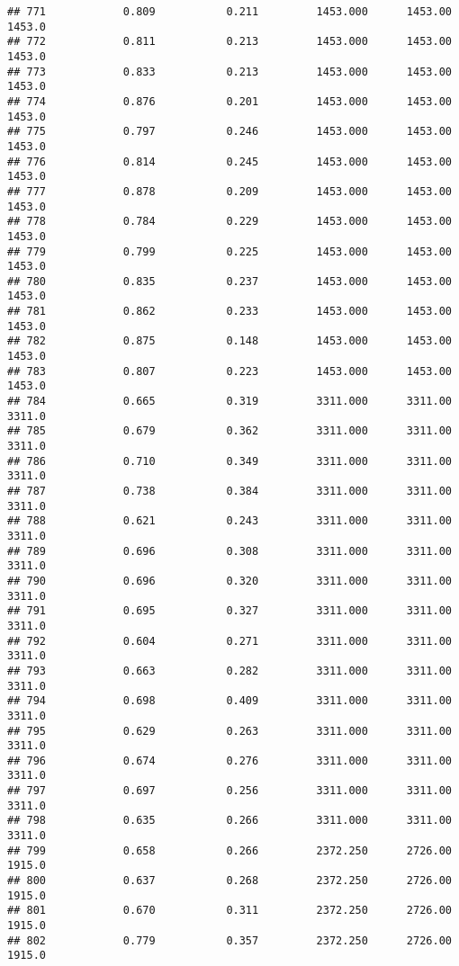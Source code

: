 \documentclass[
]{article}
\begin{document}
\begin{verbatim}
## 771            0.809           0.211         1453.000      1453.00       1453.0
## 772            0.811           0.213         1453.000      1453.00       1453.0
## 773            0.833           0.213         1453.000      1453.00       1453.0
## 774            0.876           0.201         1453.000      1453.00       1453.0
## 775            0.797           0.246         1453.000      1453.00       1453.0
## 776            0.814           0.245         1453.000      1453.00       1453.0
## 777            0.878           0.209         1453.000      1453.00       1453.0
## 778            0.784           0.229         1453.000      1453.00       1453.0
## 779            0.799           0.225         1453.000      1453.00       1453.0
## 780            0.835           0.237         1453.000      1453.00       1453.0
## 781            0.862           0.233         1453.000      1453.00       1453.0
## 782            0.875           0.148         1453.000      1453.00       1453.0
## 783            0.807           0.223         1453.000      1453.00       1453.0
## 784            0.665           0.319         3311.000      3311.00       3311.0
## 785            0.679           0.362         3311.000      3311.00       3311.0
## 786            0.710           0.349         3311.000      3311.00       3311.0
## 787            0.738           0.384         3311.000      3311.00       3311.0
## 788            0.621           0.243         3311.000      3311.00       3311.0
## 789            0.696           0.308         3311.000      3311.00       3311.0
## 790            0.696           0.320         3311.000      3311.00       3311.0
## 791            0.695           0.327         3311.000      3311.00       3311.0
## 792            0.604           0.271         3311.000      3311.00       3311.0
## 793            0.663           0.282         3311.000      3311.00       3311.0
## 794            0.698           0.409         3311.000      3311.00       3311.0
## 795            0.629           0.263         3311.000      3311.00       3311.0
## 796            0.674           0.276         3311.000      3311.00       3311.0
## 797            0.697           0.256         3311.000      3311.00       3311.0
## 798            0.635           0.266         3311.000      3311.00       3311.0
## 799            0.658           0.266         2372.250      2726.00       1915.0
## 800            0.637           0.268         2372.250      2726.00       1915.0
## 801            0.670           0.311         2372.250      2726.00       1915.0
## 802            0.779           0.357         2372.250      2726.00       1915.0

\end{verbatim}
\end{document}
